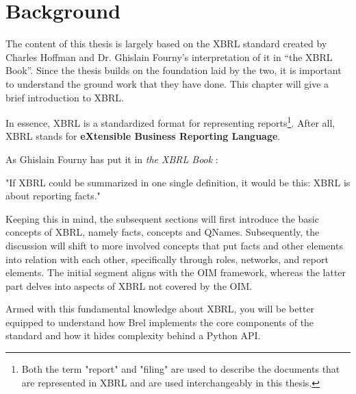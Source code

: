 \section{Background}

The content of this thesis is largely based on the XBRL standard\cite{xbrl} created by Charles Hoffman and Dr. Ghislain Fourny's interpretation of it in ``the XBRL Book''\cite{fourny2023xbrl}.
Since the thesis builds on the foundation laid by the two, it is important to understand the ground work that they have done.
This chapter will give a brief introduction to XBRL.

In essence, XBRL is a standardized format for representing reports\footnote{Both the term "report" and "filing" are used to describe the documents that are represented in XBRL and are used interchangeably in this thesis.}.
After all, XBRL stands for \textbf{eXtensible Business Reporting Language}.\cite{xbrl}

As Ghislain Fourny has put it in \textit{the XBRL Book} \cite{fourny2023xbrl}:
\begin{displayquote}
    "If XBRL could be summarized in one single definition, it would be this:
    XBRL is about reporting facts."
\end{displayquote}

Keeping this in mind, the subsequent sections will first introduce the basic concepts of XBRL, namely facts, concepts and QNames.
Subsequently, the discussion will shift to more involved concepts that put facts and other elements into relation with each other, 
specifically through roles, networks, and report elements.
The initial segment aligns with the OIM framework, whereas the latter part delves into aspects of XBRL not covered by the OIM.

Armed with this fundamental knowledge about XBRL, 
you will be better equipped to understand how Brel implements the core components of the standard and how it hides complexity behind a Python API.

